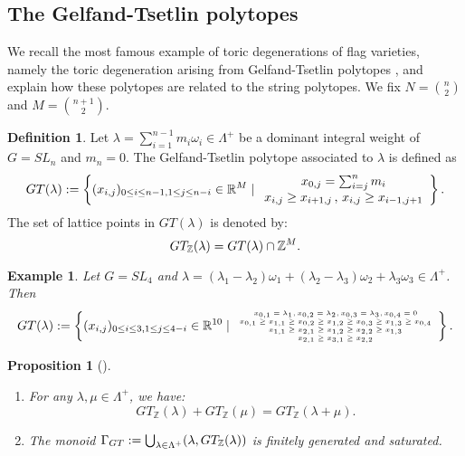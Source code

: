 \documentclass{emsprocart}
\newtheorem{proposition}[theorem]{Proposition}
\newtheorem{example}[theorem]{Example}
\theoremstyle{definition}
\newtheorem{definition}[theorem]{Definition}
\begin{document}
\subsection{The Gelfand-Tsetlin polytopes}
We recall the most famous example of toric degenerations of flag varieties, namely the toric degeneration arising from Gelfand-Tsetlin polytopes \cite{GT}, and explain how these polytopes are related to the string polytopes. We fix $N=\binom{n}{2}$ and $M=\binom{n+1}{2}$.
\begin{definition}\label{gt-polytope}
Let $\lambda = \sum_{i =1}^{n-1} m_i \omega_i \in \Lambda^+$ be a dominant integral weight of $G=SL_n$ and $m_n=0$. The Gelfand-Tsetlin polytope associated to $\lambda$ is defined as
\[
GT(\lambda)\index{$GT(\lambda)$, Gelfand-Tsetlin polytope} :=  \left\{ (x_{i,j})_{0 \leq i \leq n-1, 1 \leq j \leq n - i} \in \mathbb{R}^M \mid \begin{array}{c} x_{0,j} = \sum_{i = j}^n m_i \\   x_{i,j} \geq x_{i+1, j}  \, , \, x_{i,j} \geq  x_{i-1, j+1} \end{array} \right\}.
\]
The set of lattice points in $GT(\lambda)$ is denoted by:
\[
GT_{\mathbb{Z}}(\lambda)\index{$GT_{\mathbb{Z}}(\lambda)$, lattice points in Gelfand-Tsetlin polytope} = GT(\lambda) \cap \mathbb{Z}^M.
\]
\end{definition}
\begin{example}
Let $G = SL_4$ and $\lambda = (\lambda_1-\lambda_2) \omega_1 + (\lambda_2-\lambda_3) \omega_2 + \lambda_3 \omega_3\in \Lambda^+$. Then
\[
GT(\lambda) :=  \left\{ 
{\tiny
(x_{i,j})_{0 \leq i \leq 3, 1 \leq j \leq 4 - i} \in \mathbb{R}^{10} \mid
\begin{array}{c} x_{0,1} = \lambda_1, x_{0,2} =\lambda_2, x_{0,3} = \lambda_3, x_{0,4} =  0\\  x_{0,1} \geq x_{1,1} \geq x_{0,2} \geq x_{1,2} \geq x_{0,3} \geq x_{1,3} \geq x_{0,4} \\
x_{1,1} \geq x_{2,1} \geq x_{1,2} \geq x_{2,2} \geq x_{1,3} \\
x_{2,1} \geq x_{3,1} \geq x_{2,2}
\end{array} 
}
\right\}.
\]
\end{example}
\begin{proposition}[\cite{GT}]
\begin{enumerate}
\item For any $\lambda, \mu \in \Lambda^+$, we have:
\[
GT_{\mathbb{Z}}(\lambda)  + GT_{\mathbb{Z}}(\mu)  = GT_{\mathbb{Z}}(\lambda + \mu).
\]
\item The monoid $\Gamma_{GT}\index{$\Gamma_{GT}$, Gelfand-Tsetlin monoid} := \bigcup_{\lambda \in \Lambda^+} (\lambda, GT_{\mathbb{Z}}(\lambda) )$ is finitely generated and saturated.
\end{enumerate}
\end{proposition}
\end{document}

